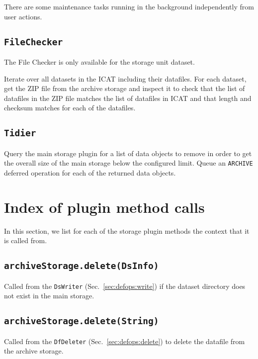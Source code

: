 \documentclass[paper=a4]{scrartcl}
\begin{document}
There are some maintenance tasks running in the background
independently from user actions.

\subsection{\texttt{FileChecker}}
\label{sec:maintenance:filechecker}

The File Checker is only available for the storage unit dataset.

Iterate over all datasets in the ICAT including their datafiles.  For
each dataset, get the ZIP file from the archive storage and inspect it
to check that the list of datafiles in the ZIP file matches the list
of datafiles in ICAT and that length and checksum matches for each of
the datafiles.

\subsection{\texttt{Tidier}}
\label{sec:maintenance:tidier}

Query the main storage plugin for a list of data objects to remove in
order to get the overall size of the main storage below the configured
limit.  Queue an \texttt{ARCHIVE} deferred operation for each of the
returned data objects.


\section{Index of plugin method calls}
\label{sec:plugincalls}

In this section, we list for each of the storage plugin methods the
context that it is called from.

\subsection{\texttt{archiveStorage.delete(DsInfo)}}

Called from the \texttt{DsWriter} (Sec.~\ref{sec:defops:write}) if
the dataset directory does not exist in the main storage.

\subsection{\texttt{archiveStorage.delete(String)}}

Called from the \texttt{DfDeleter} (Sec.~\ref{sec:defops:delete}) to
delete the datafile from the archive storage.
\end{document}
